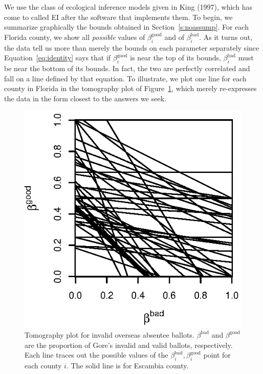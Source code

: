 \documentclass[11pt,titlepage]{article}
\newcommand{\bb}{\beta^{\text{bad}}}
\newcommand{\bg}{\beta^{\text{good}}}
\begin{document}
We use the class of ecological inference models given in King
(1997)\nocite{king:97}, which has come to called EI after the software
that implements them.  To begin, we summarize graphically the bounds
obtained in Section~\ref{s:noassump}.  For each Florida county, we
show all \emph{possible} values of $\bg_i$ and of $\bb_i$.  As it
turns out, the data tell us more than merely the bounds on each
parameter separately since Equation~\ref{eq:identity} says that if
$\bg_i$ is near the top of its bounds, $\bb_i$ must be near the bottom
of its bounds.  In fact, the two are perfectly correlated and fall on
a line defined by that equation.  To illustrate, we plot one line for
each county in Florida in the tomography plot of
Figure~\ref{fg:tomog}, which merely re-expresses the data in the form
closest to the answers we seek.
\begin{figure}[t]
  \vspace{-0.5in}
  \begin{minipage}[c]{6.5in}
    \begin{center}
      \includegraphics{tomog-rev}
    \end{center}
  \end{minipage}
  \caption{\label{fg:tomog}
    Tomography plot for invalid overseas absentee ballots.  $\bb$ and
    $\bg$ are the proportion of Gore's invalid and valid ballots,
    respectively.  Each line traces out the possible values of the
    $\bb_i,\bg_i$ point for each county $i$. The solid line is for
    Escambia county.}
\end{figure}
\end{document}
